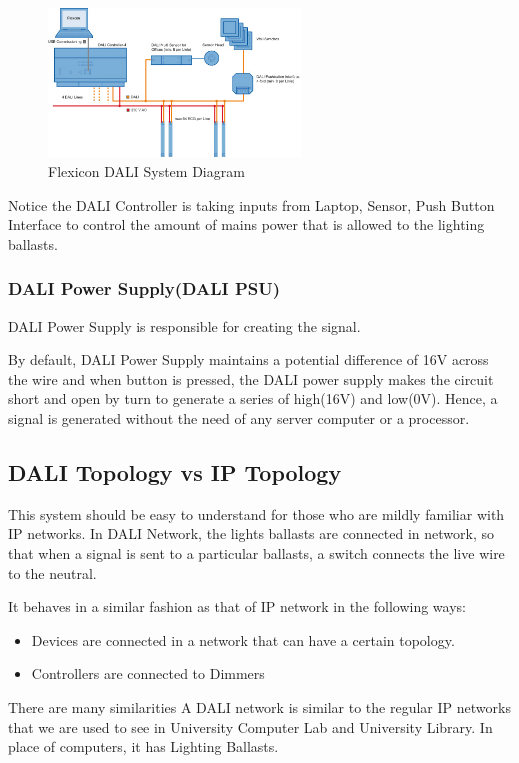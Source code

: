 \documentclass{article}
\begin{document}
\begin{center}
\begin{figure}[ht]
\includegraphics[width = 0.6\textwidth]{images/flexicon.jpg}
\caption{Flexicon DALI System Diagram}
\end{figure}
\end{center}

Notice the DALI Controller is taking inputs from Laptop, Sensor, Push Button Interface to control the amount of mains power that is allowed to the lighting ballasts.

\subsubsection{DALI Power Supply(DALI PSU)}
DALI Power Supply is responsible for creating the signal.

By default, DALI Power Supply maintains a potential difference of 16V across the wire and when button is pressed, the DALI power supply makes the circuit short and open by turn to generate a series of high(16V) and low(0V). Hence, a signal is generated without the need of any server computer or a processor.

\subsection{DALI Topology vs IP Topology}
This system should be easy to understand for those who are mildly familiar with IP networks. In DALI Network, the lights ballasts are connected in network, so that when a signal is sent to a particular ballasts, a switch connects the live wire to the neutral. 

It behaves in a similar fashion as that of IP network in the following ways:
\begin{itemize}
\item Devices are connected in a network that can have a certain topology.
\item Controllers are connected to Dimmers
\end{itemize}
There are many similarities 
A DALI network is similar to the regular IP networks that we are used to see in University Computer Lab and University Library. In place of computers, it has Lighting Ballasts.
\end{document}
